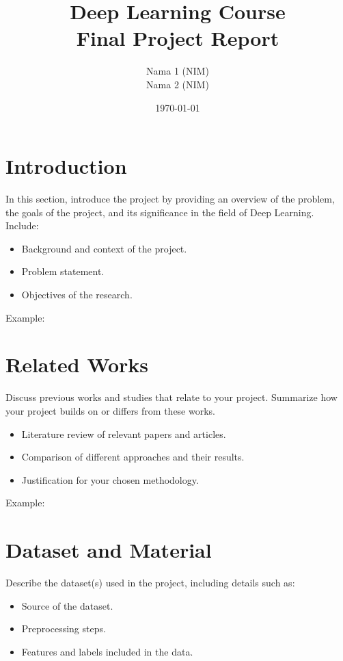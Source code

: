 \documentclass[12pt,a4paper]{article}
\title{\textbf{Deep Learning Course \\ Final Project Report}}
\author{Nama 1 (NIM)\\ Nama 2 (NIM)}
\date{\today}
\begin{document}
\maketitle
\tableofcontents
\newpage

\section{Introduction}
In this section, introduce the project by providing an overview of the problem, the goals of the project, and its significance in the field of Deep Learning. Include:
\begin{itemize}
    \item Background and context of the project.
    \item Problem statement.
    \item Objectives of the research.
\end{itemize}

\noindent Example:
\lipsum[1] %

\section{Related Works}
Discuss previous works and studies that relate to your project. Summarize how your project builds on or differs from these works.
\begin{itemize}
    \item Literature review of relevant papers and articles.
    \item Comparison of different approaches and their results.
    \item Justification for your chosen methodology.
\end{itemize}

\noindent Example:
\lipsum[2] %

\section{Dataset and Material}
Describe the dataset(s) used in the project, including details such as:
\begin{itemize}
    \item Source of the dataset.
    \item Preprocessing steps.
    \item Features and labels included in the data.
\end{itemize}
\end{document}

